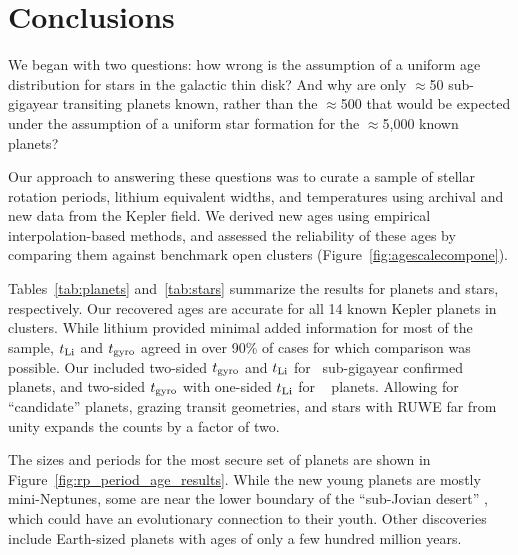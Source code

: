 \documentclass[11pt,twocolumn,tighten]{aastex63}
\begin{document}
\section{Conclusions}
\label{sec:conclusions}

We began with two questions: how wrong is the assumption of
a uniform age distribution for stars in the galactic thin disk?  And
why are only $\approx$50 sub-gigayear transiting planets known, rather
than the $\approx$500 that would be expected under the assumption of a
uniform star formation  for the $\approx$5{,}000 known planets?

Our approach to answering these questions was to curate a sample of
stellar rotation periods, lithium equivalent widths, and temperatures
using archival and new data from the Kepler field.  We derived new
ages using empirical interpolation-based methods, and assessed the
reliability of these ages by comparing them against benchmark open
clusters (Figure~\ref{fig:agescalecompone}).

Tables~\ref{tab:planets} and~\ref{tab:stars} summarize the results for
planets and stars, respectively.  Our recovered ages are accurate for
all 14 known Kepler planets in clusters.  While lithium provided
minimal added information for most of the sample, $t_{\rm Li}$ and
$t_{\rm gyro}$ agreed in over 90\% of cases for which comparison
was possible.  Our  included two-sided $t_{\rm gyro}$
and $t_{\rm Li}$ for \ltonegyrhighqconfirmedtwosided\ sub-gigayear
confirmed planets, and two-sided $t_{\rm gyro}$ with one-sided $t_{\rm
Li}$ for \ltonegyrhighqconfirmedonesided\ 
planets.  Allowing for ``candidate'' planets, grazing transit
geometries, and stars with RUWE far from unity expands the counts by a
factor of two.

The sizes and periods for the most secure set of planets are shown in
Figure~\ref{fig:rp_period_age_results}.   While the new young planets
are mostly mini-Neptunes, some are near the lower boundary of the
``sub-Jovian desert'' \citep{Owen2018}, which could have an
evolutionary connection to their youth.  Other discoveries include
Earth-sized planets with ages of only a few hundred million years.  

\end{document}
